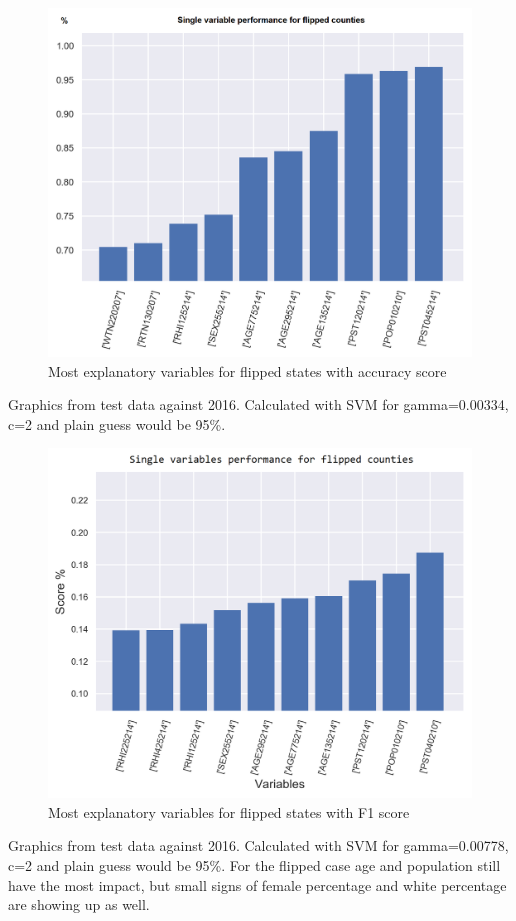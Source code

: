 \begin{figure}[H]
\centering
\includegraphics[scale=0.2]{pictures/results/max_flipp.png}
\caption{Most explanatory variables for flipped states with accuracy score}
\end{figure}
Graphics from test data against 2016. Calculated with SVM for gamma=0.00334, c=2 and plain guess would be 95\%.

\begin{figure}[H]
\centering
\includegraphics[scale=0.2]{pictures/results/f1_score.png} 
\caption{Most explanatory variables for flipped states with F1 score}
\end{figure}
Graphics from test data against 2016. Calculated with SVM for gamma=0.00778, c=2 and plain guess would be 95\%. For the flipped case age and population still have the most impact, but small signs of female percentage and white percentage are showing up as well.

